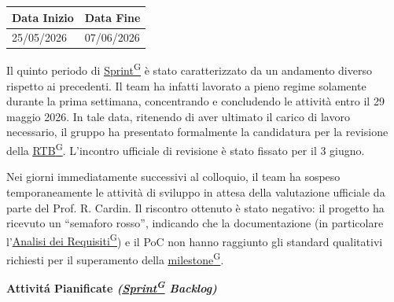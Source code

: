 \documentclass[a4paper,12pt]{article}
\newcounter{subsubsubsection}[subsubsection]
\providecommand{\glslink}[2]{\href{https://alittlebyte-19.github.io/Documentazione/glossario.html\#gls-#1}{\underline{#2}\textsuperscript{\scriptsize G}}}
\begin{document}

\label{sec:rtb_quintoperiodo}
\begin{table}[H]
    \centering
    \renewcommand{\arraystretch}{1.5} 
    \begin{tabularx}{\textwidth}{|X|X|}
    \hline \rowcolor{Dandelion!50}
    \textbf{Data Inizio} & \textbf{Data Fine}\\
    \hline
    25/05/2026 & 07/06/2026\\
    \hline

    \end{tabularx}
\end{table}

Il quinto periodo di \glslink{sprint}{Sprint} è stato caratterizzato da un andamento diverso rispetto ai precedenti. Il team ha infatti lavorato a pieno regime solamente durante la prima settimana, concentrando e concludendo le attività entro il 29 maggio 2026. In tale data, ritenendo di aver ultimato il carico di lavoro necessario, il gruppo ha presentato formalmente la candidatura per la revisione della \glslink{rtb-requirements-and-technology-baseline}{RTB}. L'incontro ufficiale di revisione è stato fissato per il 3 giugno. 

Nei giorni immediatamente successivi al colloquio, il team ha sospeso temporaneamente le attività di sviluppo in attesa della valutazione ufficiale da parte del Prof. R. Cardin. Il riscontro ottenuto è stato negativo: il progetto ha ricevuto un ``semaforo rosso'', indicando che la documentazione (in particolare l'\glslink{analisi-dei-requisiti-adr}{Analisi dei Requisiti}) e il PoC non hanno raggiunto gli standard qualitativi richiesti per il superamento della \glslink{milestone}{milestone}.

\begin{center}
\noindent\textbf{Attivitá Pianificate \textit{(\glslink{sprint}{Sprint} Backlog)}}\\
\end{center}
\end{document}
